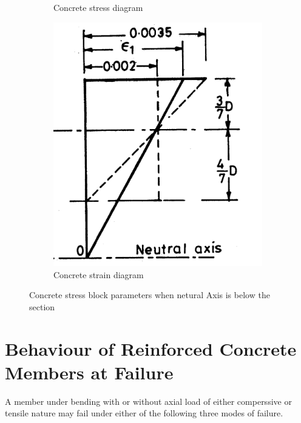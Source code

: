 \begin{figure}
\begin{subfigure}{0.3\textwidth}
\caption{Concrete stress diagram}
\label{fig:sec}
\end{subfigure}
%
\begin{subfigure}{0.3\textwidth}
\centering
\includegraphics[width=\textwidth]{images/conretestraiinc.png}
\caption{Concrete strain diagram}
\label{fig:con}
\end{subfigure}
\caption{Concrete stress block parameters when netural Axis is below the section}
\label{fig:block}
\end{figure}

\section{Behaviour of Reinforced Concrete Members at Failure}
A member under bending with or without axial load of either comperssive
or tensile nature may fail under either of the following three modes of
failure.

